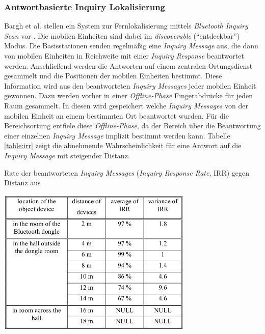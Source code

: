 \subsubsection{Antwortbasierte Inquiry Lokalisierung}
\label{ch:Vorherige:sec:irr}
Bargh et al. stellen ein System zur Fernlokalisierung mittels \emph{Bluetooth Inquiry Scan} vor \cite{bargh2008indoor}.
Die mobilen Einheiten sind dabei im \emph{discoverable} ("`entdeckbar"') Modus.
Die Basisstationen senden regelmäßig eine \emph{Inquiry Message} aus, die dann von mobilen Einheiten in Reichweite mit einer \emph{Inquiry Response} beantwortet werden. 
Anschließend werden die Antworten auf einem zentralen Ortungsdienst gesammelt und die Positionen der mobilen Einheiten bestimmt.
Diese Information wird aus den beantworteten \emph{Inquiry Messages} jeder mobilen Einheit gewonnen.
Dazu werden vorher in einer \emph{Offline-Phase} Fingerabdrücke für jeden Raum gesammelt.
In diesen wird gespeichert welche \emph{Inquiry Messages} von der mobilen Einheit an einem bestimmten Ort beantwortet wurden.
Für die Bereichsortung entfiele diese \emph{Offline-Phase}, da der Bereich über die Beantwortung einer einzelnen \emph{Inquiry Message} implizit bestimmt werden kann.
Tabelle \ref{table:irr} zeigt die abnehmende Wahrscheinlichkeit für eine Antwort auf die \emph{Inquiry Message} mit steigender Distanz.

\begin{table}[h]
  \centering
  \caption{Rate der beantworteten \emph{Inquiry Messages} (\emph{Inquiry Response Rate}, IRR) gegen Distanz aus \cite{bargh2008indoor}}
	\includegraphics[width=0.7\textwidth]{images/irr.png}

  \label{table:irr}
\end{table}

